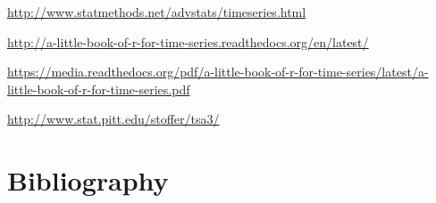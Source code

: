 \documentclass[
]{book}
\begin{document}
\url{http://www.statmethods.net/advstats/timeseries.html}

\url{http://a-little-book-of-r-for-time-series.readthedocs.org/en/latest/}

\url{https://media.readthedocs.org/pdf/a-little-book-of-r-for-time-series/latest/a-little-book-of-r-for-time-series.pdf}

\url{http://www.stat.pitt.edu/stoffer/tsa3/}

\hypertarget{part-bibliography}{%
\part{Bibliography}\label{part-bibliography}}

  
\end{document}
